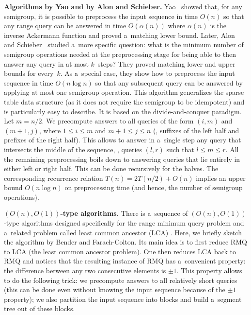 \documentclass{toc}
\begin{document}
\textbf{Algorithms by Yao and by Alon and Schieber.}
Yao~\cite{DBLP:conf/stoc/Yao82} showed that, for any semigroup, it is possible
to preprocess the input sequence in time $O(n)$ so that
any range query can be answered %
in time $O(\alpha(n))$ where $\alpha(n)$ is the inverse Ackermann function
and proved a~matching lower bound. Later, Alon and
Schieber~\cite{Alon87optimalpreprocessing} studied a~more specific question:
what is the minimum number of semigroup operations needed at the preprocessing
stage for being able to then answer any query in at most $k$~steps? They proved
matching lower and upper bounds for every~$k$. As a~special case, they show how
to preprocess the input sequence in time $O(n\log n)$ so that %
any subsequent query
can be answered %
by applying at most one semigroup operation. This algorithm
generalizes the sparse table data structure (as it does not require the
semigroup to be idempotent) and is particularly easy to describe. It is based on
the divide-and-conquer paradigm. Let $m=n/2$. We precompute answers to all
queries of the form $(i,m)$ and $(m+1,j)$, where $1 \le i \le m$ and
$m+1 \le j \le n$ (\ie, suffixes of the left half and prefixes of the right
half). This allows to answer in a~single step any query that intersects the
middle of the sequence, \ie, queries $(l,r)$ such that $l \le m \le r$. All the
remaining preprocessing boils down to answering queries that lie entirely in
either left or right half. This can be done recursively for the halves. The
corresponding recurrence relation $T(n)=2T(n/2)+O(n)$ implies an upper bound
$O(n\log n)$ on preprocessing time (and hence, the number of semigroup
operations).

\textbf{$(O(n), O(1))$-type algorithms.}
There is a~sequence of $(O(n), O(1))$-type algorithms designed specifically
for  %
the range minimum query problem and a~related problem called least common
ancestor (LCA) \cite{DBLP:journals/siamcomp/BerkmanV93,
    DBLP:journals/jal/BenderFPSS05,
    DBLP:conf/latin/BenderF00,
    DBLP:conf/cpm/FischerH06}. Here, we briefly sketch the algorithm by Bender and
Farach-Colton. Its main idea is to first reduce RMQ to LCA (the least common
ancestor problem). One then reduces LCA back to RMQ and notices that the
resulting instance of RMQ has a~convenient property: the difference between any
two consecutive elements is $\pm 1$. This property allows to do the following
trick: we precompute answers to all relatively short queries (this can be done
even without knowing the input sequence because of the $\pm 1$ property); we
also partition the input sequence into blocks and build a~segment tree out of
these blocks.
\end{document}
